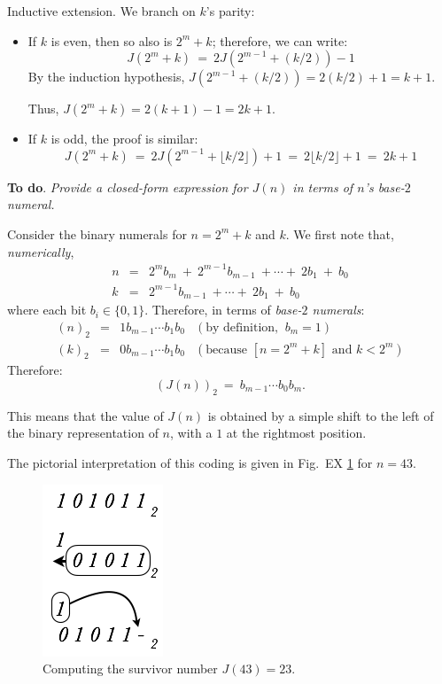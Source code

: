 \begin{itemize}
\begin{itemize}
{\sf Inductive extension}.
We branch on $k$'s parity:
\begin{itemize}
\item If $k$ is even, then so also is $2^m+k$; therefore, we can write:
\[ J(2^m+k) \ = \ 2J(2^{m-1}+(k/2))-1 \]
By the induction hypothesis, $J(2^{m-1} + (k/2)) = 2(k/2) +1 = k+1$.

Thus, $J(2^m+k) = 2(k+1) -1 = 2k+1$.

\item 
If $k$ is odd, the proof is similar:
\[ J(2^m+k) \ = \ 2J(2^{m-1}+\lfloor k/2 \rfloor)+1 \ = \ 2\lfloor k/2 \rfloor +1 \ = \ 2k+1 \]
\end{itemize}

\end{itemize}

\medskip

{\bf To do}. {\em Provide a closed-form expression for $J(n)$ in terms of $n$'s base-$2$ numeral.}

\medskip

Consider the binary numerals for $n = 2^m +k$ and $k$.  We first note that, {\em numerically},
\begin{eqnarray*}
n & = & 2^m b_m \ + \ 2^{m-1} b_{m-1} \ + \cdots + \ 2 b_1 \ + \ b_0 \\
k & = & 2^{m-1}  b_{m-1} \ + \cdots + \ 2 b_1 \ + \ b_0
\end{eqnarray*} 
where each bit $b_i \in \{0,1\}$.  Therefore, in terms of {\em base-$2$ numerals}:
\[ \begin{array}{ccrl}
(n)_2 & = & 1 b_{m-1} \cdots b_1 b_0 & (\mbox{by definition, } \ b_m=1) \\ 
(k)_2 & = & 0 b_{m-1} \cdots b_1 b_0 & (\mbox{because } [n = 2^m +k] \mbox{ and } k < 2^m)
\end{array}
\]
Therefore:
\[ (J(n))_2 \ = \ b_{m-1} \cdots b_0 b_m. \]

This means that the value of $J(n)$ is obtained by a simple shift to the left of the binary representation of $n$, with a $1$ at the rightmost position.

\smallskip

The pictorial interpretation of this coding is given in Fig.~EX \ref{fig:josephusCoding} for $n=43$.
\begin{figure}[h]
\begin{center}
        \includegraphics[scale=0.35]{FiguresMaths/josephusCoding}
        \caption{Computing the survivor number $J(43)=23$.}
        \label{fig:josephusCoding}
\end{center}
\end{figure}

\end{itemize}

